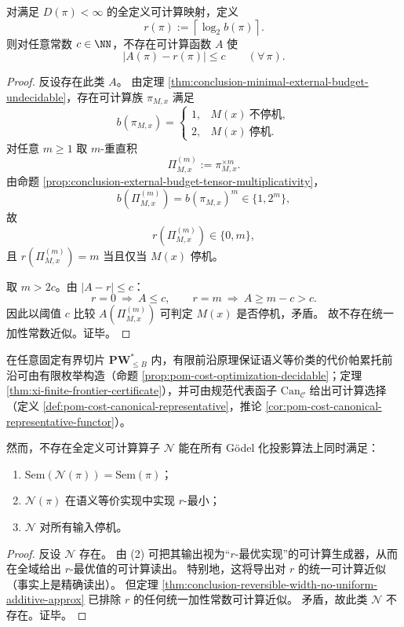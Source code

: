 \begin{theorem}[二进制可逆化宽度不存在统一加性常数近似]\label{thm:conclusion-reversible-width-no-uniform-additive-approx}
对满足 \(D(\pi)<\infty\) 的全定义可计算映射，定义
\[
r(\pi):=\left\lceil\log_2 b(\pi)\right\rceil.
\]
则对任意常数 \(c\in\NN\)，不存在可计算函数 \(A\) 使
\[
|A(\pi)-r(\pi)|\le c\qquad(\forall\,\pi).
\]
\end{theorem}
\begin{proof}
反设存在此类 \(A\)。
由定理 \ref{thm:conclusion-minimal-external-budget-undecidable}，存在可计算族 \(\pi_{M,x}\) 满足
\[
b(\pi_{M,x})=
\begin{cases}
1,&M(x)\ \text{不停机},\\
2,&M(x)\ \text{停机}.
\end{cases}
\]
对任意 \(m\ge 1\) 取 \(m\)-重直积
\[
\Pi_{M,x}^{(m)}:=\pi_{M,x}^{\times m}.
\]
由命题 \ref{prop:conclusion-external-budget-tensor-multiplicativity}，
\[
b(\Pi_{M,x}^{(m)})=b(\pi_{M,x})^m\in\{1,2^m\},
\]
故
\[
r(\Pi_{M,x}^{(m)})\in\{0,m\},
\]
且 \(r(\Pi_{M,x}^{(m)})=m\) 当且仅当 \(M(x)\) 停机。

取 \(m>2c\)。由 \(|A-r|\le c\)：
\[
r=0\ \Longrightarrow\ A\le c,\qquad
r=m\ \Longrightarrow\ A\ge m-c>c.
\]
因此以阈值 \(c\) 比较 \(A(\Pi_{M,x}^{(m)})\) 可判定 \(M(x)\) 是否停机，矛盾。
故不存在统一加性常数近似。证毕。
\end{proof}

\begin{theorem}[有界切片可计算最优与全域最优综合器不可延拓]\label{thm:conclusion-slice-computable-global-optimal-synthesizer-impossible}
在任意固定有界切片 \(\mathbf{PW}^{\ast}_{\le B}\) 内，有限前沿原理保证语义等价类的代价帕累托前沿可由有限枚举构造（命题 \ref{prop:pom-cost-optimization-decidable}；定理 \ref{thm:xi-finite-frontier-certificate}），并可由规范代表函子 \(\mathrm{Can}_{\mathcal C}\) 给出可计算选择（定义 \ref{def:pom-cost-canonical-representative}，推论 \ref{cor:pom-cost-canonical-representative-functor}）。

然而，不存在全定义可计算算子 \(\mathcal N\) 能在所有 Gödel 化投影算法上同时满足：
\begin{enumerate}
  \item \(\mathrm{Sem}(\mathcal N(\pi))=\mathrm{Sem}(\pi)\)；
  \item \(\mathcal N(\pi)\) 在语义等价实现中实现 \(r\)-最小；
  \item \(\mathcal N\) 对所有输入停机。
\end{enumerate}
\end{theorem}
\begin{proof}
反设 \(\mathcal N\) 存在。
由 (2) 可把其输出视为“\(r\)-最优实现”的可计算生成器，从而在全域给出 \(r\)-最优值的可计算读出。
特别地，这将导出对 \(r\) 的统一可计算近似（事实上是精确读出）。
但定理 \ref{thm:conclusion-reversible-width-no-uniform-additive-approx} 已排除 \(r\) 的任何统一加性常数可计算近似。
矛盾，故此类 \(\mathcal N\) 不存在。证毕。
\end{proof}

